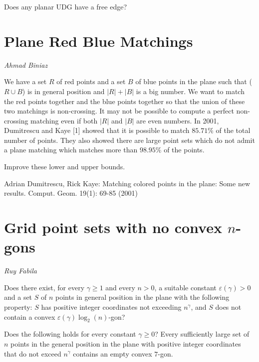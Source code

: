 \documentclass{patmorin}
\begin{document}
\begin{op}
  Does any planar UDG have a free edge?
\end{op}


\section{Plane Red Blue Matchings}

\noindent\emph{Ahmad Biniaz}

We have a set $R$ of red points and a set $B$ of blue points in the plane such that ($R\cup B$) is in general position and $|R|+|B|$ is a big number. We want to match the red points together and the blue points together so that the union of these two matchings is non-crossing. It may not be possible to compute a perfect non-crossing matching even if both $|R|$ and $|B|$ are even numbers. In 2001, Dumitrescu and Kaye [1] showed that it is possible to match $85.71\%$ of the total number of points. They also showed there are large point sets which do not admit a plane matching which matches more than $98.95\%$ of the points. 

\begin{op}
  Improve these lower and upper bounds.
\end{op}

\noindent
Adrian Dumitrescu, Rick Kaye: Matching colored points in the plane: Some new results. Comput. Geom. 19(1): 69-85 (2001)

\section{Grid point sets with no convex $n$-gons}

\noindent\emph{Ruy Fabila}

\begin{op}
  Does there exist, for every $\gamma \ge 1$ and every $n >0$, a suitable constant $\varepsilon(\gamma)>0$ and a set $S$
  of $n$ points in general position in the plane
  with the following property:
 $S$ has positive integer coordinates not exceeding $n^\gamma$, and $S$ does not contain a convex $\varepsilon(\gamma)\log_2(n)$-gon?
\end{op}

\begin{op}\label{prob:int_empty}
 Does the following holds for every constant $\gamma \ge 0$? 
 Every sufficiently large set of $n$ points in the general position in the plane with positive integer coordinates that do not exceed
 $n^{\gamma}$ contains an empty convex $7$-gon.
\end{op}
\end{document}

